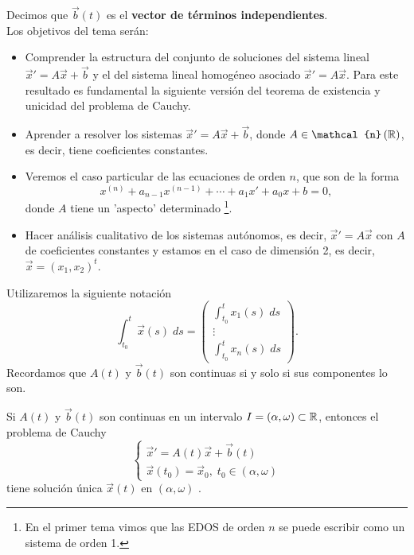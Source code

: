 Decimos que $\displaystyle \vec{b}\left(t\right) $ es el \textbf{vector de términos independientes}. \\
Los objetivos del tema serán:
\begin{itemize}
\item Comprender la estructura del conjunto de soluciones del sistema lineal $\displaystyle \vec{x}'=A\vec{x}+\vec{b} $ y el del sistema lineal homogéneo asociado $\displaystyle \vec{x}' = A\vec{x} $. Para este resultado es fundamental la siguiente versión del teorema de existencia y unicidad del problema de Cauchy.
\item Aprender a resolver los sistemas $\displaystyle \vec{x}'=A\vec{x} + \vec{b} $, donde $\displaystyle A \in \mathcal{n}\left(\R\right) $, es decir, tiene coeficientes constantes.
\item Veremos el caso particular de las ecuaciones de orden $\displaystyle n $, que son de la forma
	\[x^{\left(n\right)} + a_{n-1}x^{\left(n-1\right)} + \cdots + a_{1}x' + a_{0}x + b = 0 ,\]
	donde $\displaystyle A $ tiene un 'aspecto' determinado \footnote{En el primer tema vimos que las EDOS de orden $\displaystyle n $ se puede escribir como un sistema de orden 1.}.
\item Hacer análisis cualitativo de los sistemas autónomos, es decir, $\displaystyle \vec{x}' = A\vec{x} $ con $\displaystyle A $ de coeficientes constantes y estamos en el caso de dimensión 2, es decir, $\displaystyle \vec{x}=\left(x_{1}, x_{2}\right)^{t} $.
\end{itemize}
\begin{notation}
Utilizaremos la siguiente notación
\[\int^{t}_{t_{0}} \vec{x}\left(s\right) \; d s = \begin{pmatrix} \int^{t}_{t_{0}} x_{1}\left(s\right) \; d s \\ \vdots \\ \int^{t}_{t_{0}} x_{n}\left(s\right) \; d s \end{pmatrix} .\]
Recordamos que $\displaystyle A\left(t\right) $ y $\displaystyle \vec{b}\left(t\right) $ son continuas si y solo si sus componentes lo son.
\end{notation}

\begin{theorem}
Si $\displaystyle A\left(t\right) $ y $\displaystyle \vec{b}\left(t\right) $ son continuas en un intervalo $\displaystyle I = \left(\alpha, \omega \right)\subset \mathbb{R} $, entonces el problema de Cauchy
\[
\begin{cases}
\vec{x}' = A\left(t\right)\vec{x} + \vec{b}\left(t\right)\\
\vec{x}\left(t_{0}\right) = \vec{x}_{0}, \; t_{0} \in \left(\alpha, \omega\right)
\end{cases}
\]
tiene solución única $\displaystyle \vec{x}\left(t\right) $ en $\displaystyle \left(\alpha, \omega\right) $ . 
\end{theorem}
